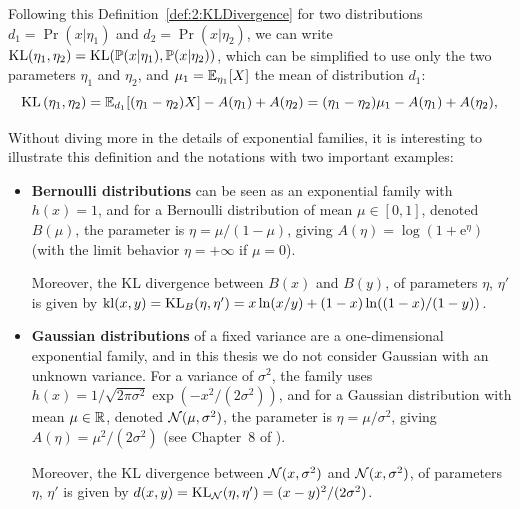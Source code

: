 Following this Definition~\ref{def:2:KLDivergence} for two distributions
$d_1=\Pr(x|\eta_1)$ and $d_2=\Pr(x|\eta_2)$,
we can write $\mathrm{KL}( \eta_1, \eta_2 ) = \mathrm{KL}(\mathbb{P}(x|\eta_1), \mathbb{P}(x|\eta_2))$, which can be simplified to use only the two parameters $\eta_1$ and $\eta_2$,
and $\mu_1 = \mathbb{E}_{\eta_1}[X]$ the mean of distribution $d_1$:
%
\begin{equation}\label{eq:2:Kullback-LeiblerDivergenceExpFamily2}
    \mathrm{KL}\left( \eta_1, \eta_2 \right) = \mathbb{E}_{d_1}[ (\eta_1 - \eta_2) X ] - A(\eta_1) + A(\eta_2) = (\eta_1 - \eta_2) \mu_1 - A(\eta_1) + A(\eta_2),
\end{equation}


Without diving more in the details of exponential families,
it is interesting to illustrate this definition and the notations with two important examples:
%
\begin{itemize}
    \item
    \textbf{Bernoulli distributions} can be seen as an exponential family with $h(x) = 1$,
    and for a Bernoulli distribution of mean $\mu\in[0,1]$, denoted $B(\mu)$,
    the parameter is $\eta = \mu / (1 - \mu)$, giving $A(\eta) = \log(1 + \mathrm{e}^{\eta})$
    (with the limit behavior $\eta=+\infty$ if $\mu=0$).

    Moreover, the KL divergence between $B(x)$ and $B(y)$, of parameters $\eta$, $\eta'$ is given by
    $\mathrm{kl}(x,y) = \mathrm{KL}_{B}(\eta,\eta') = x \ln(x/y) + (1-x) \ln((1-x)/(1-y))$.

    \item
    \textbf{Gaussian distributions} of a fixed variance are a one-dimensional exponential family,
    and in this thesis we do not consider Gaussian with an unknown variance.
    For a variance of $\sigma^2$, the family uses
    $h(x) = 1/\sqrt{2\pi\sigma^2} \exp(-x^2/(2\sigma^2))$,
    and for a Gaussian distribution with mean $\mu\in\mathbb{R}$, denoted $\mathcal{N}(\mu,\sigma^2)$,
    the parameter is $\eta = \mu/\sigma^2$, giving $A(\eta) = \mu^2/(2\sigma^2)$
    (see Chapter~8 of \cite{JordanCourseStatBerkeley}).

    Moreover, the KL divergence between $\mathcal{N}(x,\sigma^2)$ and $\mathcal{N}(x,\sigma^2)$, of parameters $\eta$, $\eta'$ is given by
    $d(x,y) = \mathrm{KL}_{\mathcal{N}}(\eta,\eta') = (x-y)^2 / (2\sigma^2)$.
\end{itemize}


